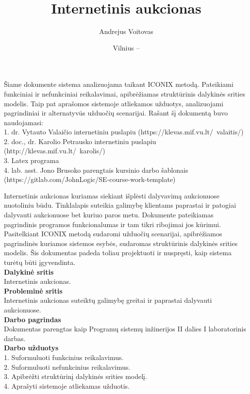 \documentclass{VUMIFPSkursinis}
\title{Internetinis aukcionas}
\author{Andrejus Voitovas}
\date{Vilnius – \the\year}
\begin{document}
\maketitle
\cleardoublepage{}
\setcounter{page}{2}
Šiame dokumente sistema analizuojama taikant ICONIX metodą. Pateikiami funkciniai ir nefunkciniai reikalavimai, apibrėžiamas struktūrinis dalykinės srities modelis. Taip pat aprašomos sistemoje atliekamos užduotys, analizuojami pagrindiniai ir alternatyvūs užduočių scenarijai. Rašant šį dokumentą buvo naudojamasi:
\\1. dr. Vytauto Valaičio internetiniu puslapiu (https://klevas.mif.vu.lt/~valaitis/)
\\2. doc., dr. Karolio Petrausko internetiniu puslapiu (http://klevas.mif.vu.lt/~karolis/)
\\3. Latex programa
\\4. lab. asst. Jono Brusoko parengtais kursinio darbo šablonais (https://gitlab.com/JohnLogic/SE-course-work-template)
\newpage
\tableofcontents

Internetinis aukcionas kuriamas siekiant išplėsti dalyvavimą aukcionuose nuotoliniu
būdu. Tinklalapis suteikia galimybę klientams paprastai ir patogiai dalyvauti aukcionuose bet kuriuo paros metu. Dokumente pateikiamas pagrindinis programos funkcionalumas ir tam tikri ribojimai jos kūrimui. Pasitelkiant ICONIX metodą sudaromi užduočių scenarijai, apibrėžiamos pagrindinės kuriamos sistemos esybės, sudaromas struktūrinis dalykinės srities modelis. Šis dokumentas padeda toliau projektuoti ir nuspręsti, kaip sistema turėtų būti įgyvendinta.
\\\textbf{Dalykinė sritis}
\\Internetinis aukcionas.
\\\textbf{Probleminė sritis} 
\\Internetinis aukcionas suteiktų galimybę greitai ir paprastai dalyvauti aukcionuose.
\\\textbf{Darbo pagrindas}
\\Dokumentas parengtas kaip Programų sistemų inžinerijos II dalies I laboratorinis darbas.
\\\textbf{Darbo užduotys}
\\1. Suformuluoti funkcinius reikalavimus.
\\2. Suformuluoti nefunkcinius reikalavimus.
\\3. Apibrėžti struktūrinį dalykinės srities modelį.
\\4. Aprašyti sistemoje atliekamas užduotis.
\newpage
\end{document}
